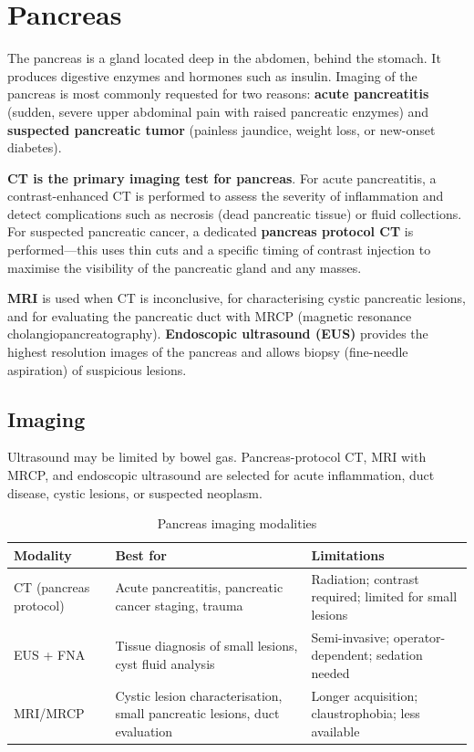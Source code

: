 \chapter{Pancreas}

\label{ch:ch47_pancreas}

The pancreas is a gland located deep in the abdomen, behind the stomach. It produces digestive enzymes and hormones such as insulin. Imaging of the pancreas is most commonly requested for two reasons: \textbf{acute pancreatitis} (sudden, severe upper abdominal pain with raised pancreatic enzymes) and \textbf{suspected pancreatic tumor} (painless jaundice, weight loss, or new-onset diabetes).

\textbf{CT is the primary imaging test for pancreas}. For acute pancreatitis, a contrast-enhanced CT is performed to assess the severity of inflammation and detect complications such as necrosis (dead pancreatic tissue) or fluid collections. For suspected pancreatic cancer, a dedicated \textbf{pancreas protocol CT} is performed---this uses thin cuts and a specific timing of contrast injection to maximise the visibility of the pancreatic gland and any masses.

\textbf{MRI} is used when CT is inconclusive, for characterising cystic pancreatic lesions, and for evaluating the pancreatic duct with MRCP (magnetic resonance cholangiopancreatography). \textbf{Endoscopic ultrasound (EUS)} provides the highest resolution images of the pancreas and allows biopsy (fine-needle aspiration) of suspicious lesions.


\section{Imaging}
Ultrasound may be limited by bowel gas. Pancreas-protocol CT, MRI with MRCP, and endoscopic ultrasound are selected for acute inflammation, duct disease, cystic lesions, or suspected neoplasm.

\begin{table}[h]
\centering
\caption{Pancreas imaging modalities}
\begin{tabular}{p{3cm} p{4cm} p{4cm}}
\hline
\textbf{Modality} & \textbf{Best for} & \textbf{Limitations} \\
\hline
CT (pancreas protocol) & Acute pancreatitis, pancreatic cancer staging, trauma & Radiation; contrast required; limited for small lesions \\
EUS + FNA & Tissue diagnosis of small lesions, cyst fluid analysis & Semi-invasive; operator-dependent; sedation needed \\
MRI/MRCP & Cystic lesion characterisation, small pancreatic lesions, duct evaluation & Longer acquisition; claustrophobia; less available \\
\hline
\end{tabular}
\end{table}

